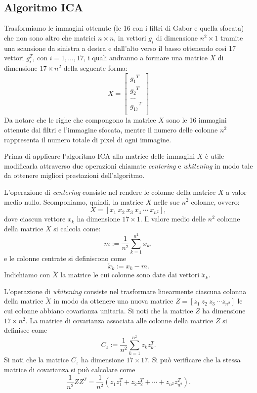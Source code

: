 \documentclass[final]{siamltex}
\begin{document}
\subsection{Algoritmo ICA}\label{sec6}
%
Trasformiamo le immagini ottenute (le 16 con i filtri di Gabor e quella sfocata) che non sono altro che matrici $n \times n$, in vettori $g_i$ di dimensione $n^2 \times 1$ tramite una scansione da sinistra a destra e dall'alto verso il basso ottenendo cos\`{i} 17 vettori $g_i^T$, con $i=1, \dots, 17$, i quali andranno a formare una matrice $X$ di dimensione $17 \times n^2$ della seguente forma: 
%
\begin{equation}
X = \begin{bmatrix}
{g_1}^T \\
{g_2}^T \\
\dots \\
{g_{17}}^T \\
\end{bmatrix}
\end{equation}
%
Da notare che le righe che compongono la matrice $X$ sono le 16 immagini ottenute dai filtri e l'immagine sfocata, mentre il numero delle colonne $n^2$ rappresenta il numero totale di pixel di ogni immagine.

Prima di applicare l'algoritmo ICA alla matrice delle immagini $X$ \`{e} utile modificarla attraverso due operazioni chiamate \textit{centering} e \textit{whitening} in modo tale da ottenere migliori prestazioni dell'algoritmo. 

 L'operazione di \emph{centering} consiste nel rendere le colonne della matrice $X$ a valor medio nullo. Scomponiamo, quindi, la matrice $X$ nelle sue $n^2$ colonne, ovvero:
%
\begin{equation}
X=[x_1\ x_2\ x_3\ x_4\ \cdots\ x_{n^2}],
\end{equation}
%
dove ciascun vettore $x_k$  ha dimensione $17\times 1$.
Il valore medio delle $n^2$ colonne della matrice $X$ si calcola come:
%
\begin{equation}
m:=\frac{1}{n^2}\sum_{k=1}^{n^2}x_k,
\end{equation}
%
e le colonne centrate si definiscono come 
%
\begin{equation}
\check{x}_k:=x_k-m.
\end{equation}
%
Indichiamo con $\check{X}$ la matrice le cui colonne sono date dai vettori $\check{x}_k$.


L'operazione di \emph{whitening} consiste nel trasformare linearmente ciascuna colonna della matrice $\check{X}$ in modo da ottenere una nuova matrice $Z=[z_1\ z_2\ z_3\ \cdots z_{n^2}]$ le cui colonne abbiano covarianza unitaria. Si noti che la matrice $Z$ ha dimensione $17\times n^2$. La matrice di covarianza associata alle colonne della matrice $Z$ si definisce come 
%
\begin{equation}
C_z:=\frac{1}{n^2}\sum_{k=1}^{n^2}z_kz_k^T.
\end{equation}
%
Si noti che la matrice $C_z$ ha dimensione $17\times 17$.
Si pu\`{o} verificare che la stessa matrice di covarianza si pu\`{o} calcolare come
%
\begin{equation}
\frac{1}{n^2}ZZ^T=\frac{1}{n^2}(z_1z_1^T+z_2z_2^T+\cdots+z_{n^2}z_{n^2}^T).
\end{equation}
\end{document}

